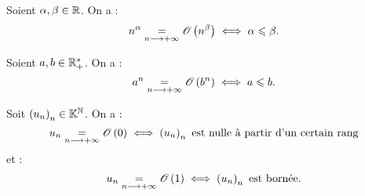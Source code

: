 \begin{ex}
Soient \(\alpha,\beta\in\R\). On a : \[n^{\alpha}\egqd{n\to\pinf}\O{n^\beta}\ssi\alpha\leq\beta.\]

Soient \(a,b\in\Rps\). On a : \[a^n\egqd{n\to\pinf}\O{b^n}\ssi a\leq b.\]

Soit \(\paren{u_n}_n\in\K^\N\). On a : \[u_n\egqd{n\to\pinf}\O{0}\ssi\paren{u_n}_n\text{ est nulle à partir d'un certain rang}\] et : \[u_n\egqd{n\to\pinf}\O{1}\ssi\paren{u_n}_n\text{ est bornée}.\]
\end{ex}